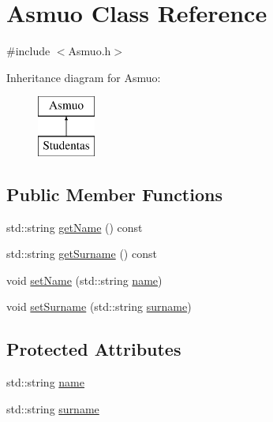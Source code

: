 \hypertarget{class_asmuo}{}\section{Asmuo Class Reference}
\label{class_asmuo}


{\ttfamily \#include $<$Asmuo.\+h$>$}

Inheritance diagram for Asmuo\+:\begin{figure}[H]
\begin{center}
\leavevmode
\includegraphics[height=2.000000cm]{class_asmuo}
\end{center}
\end{figure}
\subsection*{Public Member Functions}
\begin{DoxyCompactItemize}
\item 
std\+::string \mbox{\hyperlink{class_asmuo_ab87e009f24294baf12d682eb233d5f55}{get\+Name}} () const
\item 
std\+::string \mbox{\hyperlink{class_asmuo_aafbcab38fb6767fe1738c37957c9fb81}{get\+Surname}} () const
\item 
void \mbox{\hyperlink{class_asmuo_aa83023f021ee29d725a21487ac2767b4}{set\+Name}} (std\+::string \mbox{\hyperlink{class_asmuo_a78835e723a931acc1516881492028da1}{name}})
\item 
void \mbox{\hyperlink{class_asmuo_a4fd16c3f4ac603387225449e7ded2dc3}{set\+Surname}} (std\+::string \mbox{\hyperlink{class_asmuo_a557691d78c03a3817bc6256fd56efcb6}{surname}})
\end{DoxyCompactItemize}
\subsection*{Protected Attributes}
\begin{DoxyCompactItemize}
\item 
std\+::string \mbox{\hyperlink{class_asmuo_a78835e723a931acc1516881492028da1}{name}}
\item 
std\+::string \mbox{\hyperlink{class_asmuo_a557691d78c03a3817bc6256fd56efcb6}{surname}}
\end{DoxyCompactItemize}


